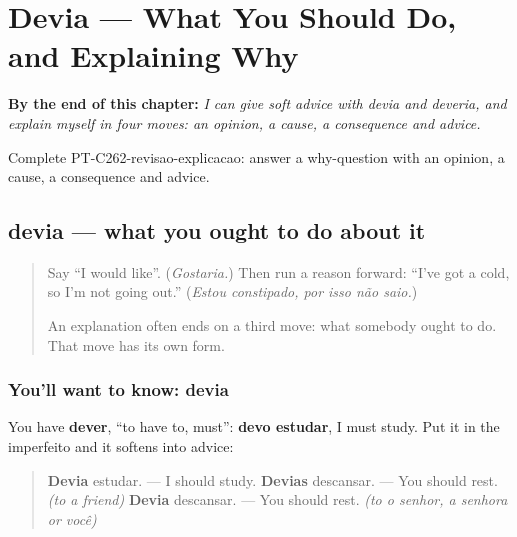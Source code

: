 
\chapter{Devia --- What You Should Do, and Explaining Why}
\label{ch:pt-should-and-explaining}

\begin{chapteropening}
\textbf{By the end of this chapter:} \emph{I can give soft advice with devia and deveria, and explain myself in four moves: an opinion, a cause, a consequence and advice.}

Complete PT-C262-revisao-explicacao: answer a why-question with an opinion, a cause, a consequence and advice.
\end{chapteropening}

\section[devia, deveria]{devia — what you ought to do about it}

\label{lesson:PT-C262-devia}



\begin{quote}
Say \textquotedblleft{}I would like\textquotedblright{}. (\emph{Gostaria.}) Then run a reason forward: \textquotedblleft{}I've got a cold, so I'm not going out.\textquotedblright{} (\emph{Estou constipado, por isso não saio.})

An explanation often ends on a third move: what somebody ought to do. That move has its own form.
\end{quote}

\subsection*{You'll want to know: devia}
You have \textbf{dever}, \textquotedblleft{}to have to, must\textquotedblright{}: \textbf{devo estudar}, I must study. Put it in the imperfeito and it softens into advice:

\begin{quote}
\textbf{Devia} estudar. — I should study. \textbf{Devias} descansar. — You should rest. \emph{(to a friend)} \textbf{Devia} descansar. — You should rest. \emph{(to o senhor, a senhora or você)}
\end{quote}

